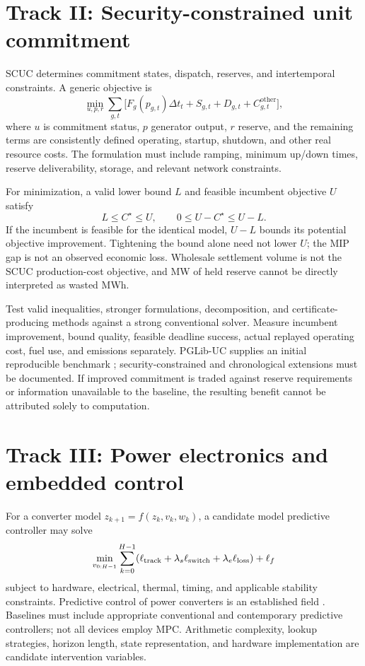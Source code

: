 \documentclass[11pt,letterpaper]{article}
\begin{document}
\section{Track II: Security-constrained unit commitment}
SCUC determines commitment states, dispatch, reserves, and intertemporal constraints. A generic objective is
\begin{equation}
\min_{u,p,r}\sum_{g,t}\big[F_g(p_{g,t})\Delta t_t+S_{g,t}+D_{g,t}+C^{\mathrm{other}}_{g,t}\big],
\end{equation}
where $u$ is commitment status, $p$ generator output, $r$ reserve, and the remaining terms are consistently defined operating, startup, shutdown, and other real resource costs. The formulation must include ramping, minimum up/down times, reserve deliverability, storage, and relevant network constraints.

For minimization, a valid lower bound $L$ and feasible incumbent objective $U$ satisfy
\begin{equation}
L\leq C^\star\leq U,\qquad 0\leq U-C^\star\leq U-L.
\end{equation}
If the incumbent is feasible for the identical model, $U-L$ bounds its potential objective improvement. Tightening the bound alone need not lower $U$; the MIP gap is not an observed economic loss. Wholesale settlement volume is not the SCUC production-cost objective, and MW of held reserve cannot be directly interpreted as wasted MWh.

Test valid inequalities, stronger formulations, decomposition, and certificate-producing methods against a strong conventional solver. Measure incumbent improvement, bound quality, feasible deadline success, actual replayed operating cost, fuel use, and emissions separately. PGLib-UC supplies an initial reproducible benchmark \cite{pglibuc}; security-constrained and chronological extensions must be documented. If improved commitment is traded against reserve requirements or information unavailable to the baseline, the resulting benefit cannot be attributed solely to computation.

\section{Track III: Power electronics and embedded control}
For a converter model $z_{k+1}=f(z_k,v_k,w_k)$, a candidate model predictive controller may solve
\begin{equation}
\min_{v_{0:H-1}}\sum_{k=0}^{H-1}
(\ell_{\rm track}+\lambda_s\ell_{\rm switch}+\lambda_e\ell_{\rm loss})+\ell_f
\end{equation}
subject to hardware, electrical, thermal, timing, and applicable stability constraints. Predictive control of power converters is an established field \cite{mpc}. Baselines must include appropriate conventional and contemporary predictive controllers; not all devices employ MPC. Arithmetic complexity, lookup strategies, horizon length, state representation, and hardware implementation are candidate intervention variables.
\end{document}

